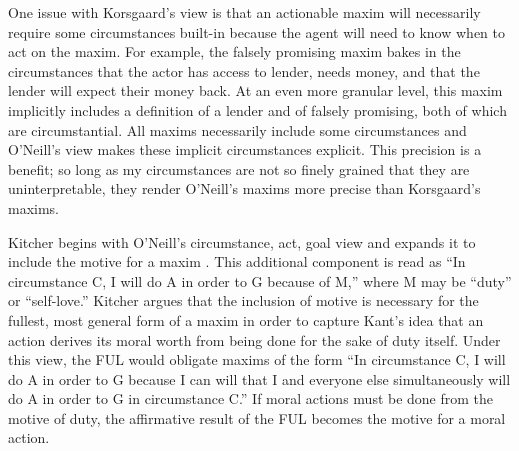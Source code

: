 \begin{isabellebody}
\begin{isamarkuptext}
One issue with Korsgaard's view is that an actionable maxim will necessarily
require some circumstances built-in because the agent will need to know when to act on the maxim. For example,
the falsely promising maxim bakes in the circumstances that the actor has access to lender, needs money, 
and that the lender will expect their money back. At an even more granular level, this maxim implicitly includes
a definition of a lender and of falsely promising, both of which are circumstantial. All
maxims necessarily include some circumstances and  O'Neill's view makes these implicit circumstances
explicit. This precision is a benefit; so long as my circumstances are not so finely grained that they
are uninterpretable, they render O'Neill's maxims more precise than Korsgaard's maxims.%
\end{isamarkuptext}\isamarkuptrue%
%
\isadelimdocument
%
\endisadelimdocument
%
\isatagdocument
%
\isamarkuptrue%
%
\endisatagdocument
{\isafolddocument}%
%
\isadelimdocument
%
\endisadelimdocument
%
\begin{isamarkuptext}%
Kitcher begins with O'Neill's 
circumstance, act, goal view and expands it to include the motive for a maxim \citep{whatisamaxim}. 
This additional component is read as ``In circumstance C, I will do A in order to G because of M,'' 
where M may be ``duty'' or ``self-love.'' Kitcher argues that the inclusion of motive is necessary 
for the fullest, most general form of a maxim in order to capture Kant's idea that an action derives 
its moral worth from being done for the sake of duty itself. Under this view, the FUL would obligate maxims of the form 
``In circumstance C, I will do A in order to G because I can will that I and everyone else simultaneously
will do A in order to G in circumstance C.'' If moral actions must be done from the motive of duty, the 
affirmative result of the FUL becomes the motive for a moral action.


\end{isamarkuptext}
\end{isabellebody}
